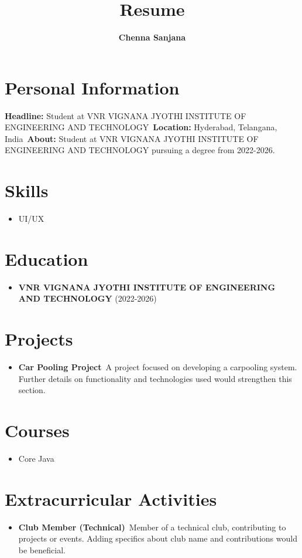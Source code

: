 \documentclass[a4paper, 12pt]{article}
\begin{document}
\title{\textbf{Resume}}
\author{\textbf{Chenna Sanjana}}
\date{}
\maketitle

\section*{Personal Information}
\textbf{Headline:} Student at VNR VIGNANA JYOTHI INSTITUTE OF ENGINEERING AND TECHNOLOGY\
\textbf{Location:} Hyderabad, Telangana, India\
\textbf{About:} Student at VNR VIGNANA JYOTHI INSTITUTE OF ENGINEERING AND TECHNOLOGY pursuing a degree from 2022-2026.

\section*{Skills}
\begin{itemize}
    \item UI/UX
\end{itemize}

\section*{Education}
\begin{itemize}
    \item \textbf{VNR VIGNANA JYOTHI INSTITUTE OF ENGINEERING AND TECHNOLOGY} (2022-2026)
\end{itemize}

\section*{Projects}
\begin{itemize}
    \item \textbf{Car Pooling Project}\
    A project focused on developing a carpooling system. Further details on functionality and technologies used would strengthen this section.
\end{itemize}

\section*{Courses}
\begin{itemize}
    \item Core Java
\end{itemize}

\section*{Extracurricular Activities}
\begin{itemize}
    \item \textbf{Club Member (Technical)}\
    Member of a technical club, contributing to projects or events. Adding specifics about club name and contributions would be beneficial.
\end{itemize}
\end{document}
